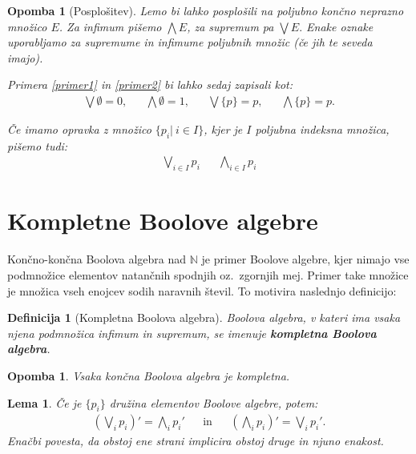 \documentclass{amsart}
\newcommand{\NN}{\mathbb{N}}
\newtheorem{lema}[izrek]{Lema}
\newtheorem{definicija}[izrek]{Definicija}
\newtheorem{opomba}[izrek]{Opomba}
\begin{document}
\begin{opomba}[Posplošitev]
    Lemo bi lahko posplošili na poljubno končno ne\-praz\-no množico \(E\). Za infimum pišemo \(\bigwedge E\), za supremum pa
    \(\bigvee E.\) Enake oznake uporabljamo za supremume in infimume poljubnih množic (če jih te seveda imajo).

    Primera \ref{primer1} in \ref{primer2} bi lahko sedaj zapisali kot:
    \begin{align*}
        \bigvee \emptyset = 0, && \bigwedge \emptyset = 1, && \bigvee \{p\} = p, && \bigwedge \{p\} = p.
    \end{align*}

    Če imamo opravka z množico \(\{p_i|~i \in I\}\), kjer je $I$ poljubna indeksna množica, pišemo tudi:
    \begin{align*}
        \bigvee_{i \in I} p_i && \bigwedge_{i \in I} p_i
    \end{align*}
\end{opomba}

\section{Kompletne Boolove algebre}

Končno-končna Boolova algebra nad \(\NN\) je primer Boolove algebre, kjer nimajo vse podmnožice elementov
natančnih spodnjih oz.~zgornjih mej. Primer take množice je množica vseh enojcev sodih naravnih števil. To motivira naslednjo definicijo:

\begin{definicija}[Kompletna Boolova algebra]
    Boolova algebra, v kateri ima vsaka njena podmnožica infimum in supremum, se imenuje {\bf kompletna
    Boolova \mbox{algebra}}.
\end{definicija}


\begin{opomba}
    Vsaka končna Boolova algebra je kompletna.
\end{opomba}

\begin{lema}
    Če je \(\{p_i\}\) družina elementov Boolove algebre, potem:
    \begin{align*}
        \left(\bigvee_{i} p_i\right)' = \bigwedge_{i} p_i' &&\text{in} && \left(\bigwedge_{i} p_i\right)' = \bigvee_{i} p_i'.
    \end{align*}
    Enačbi povesta, da obstoj ene strani implicira obstoj druge in njuno enakost.
\end{lema}
\end{document}
